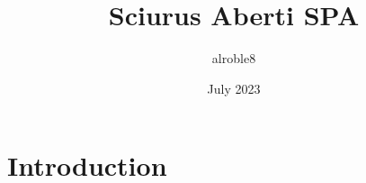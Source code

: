 \documentclass{article}
\title{Sciurus Aberti SPA}
\author{alroble8 }
\date{July 2023}
\begin{document}
\maketitle

\section{Introduction}
\end{document}
